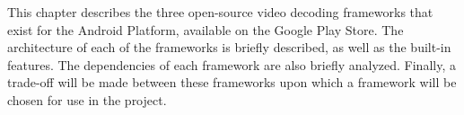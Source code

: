 This chapter describes the three open-source video decoding frameworks that exist for the Android Platform, available on the Google Play Store. The architecture of each of the frameworks is briefly described, as well as the built-in features. The dependencies of each framework are also briefly analyzed. Finally, a trade-off will be made between these frameworks upon which a framework will be chosen for use in the project.
